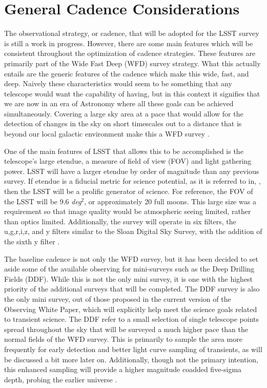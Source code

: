 \documentclass[12pt]{article}
\begin{document}
\section{General Cadence Considerations} %
The observational strategy, or cadence, that will be adopted for the LSST survey is still a work in progress. However, there are some main features which will be consistent throughout the optimization of cadence strategies. These features are primarily part of the Wide Fast Deep (WFD) survey strategy. What this actually entails are the generic features of the cadence which make this wide, fast, and deep. Naively these characteristics would seem to be something that any telescope would want the capability of having, but in this context it signifies that we are now in an era of Astronomy where all these goals can be achieved simultaneously. Covering a large sky area at a pace that would allow for the detection of changes in the sky on short timescales out to a distance that is beyond our local galactic environment make this a WFD survey \citep{LSSTScienceCollaboration2009}. \par
One of the main features of LSST that allows this to be accomplished is the telescope's large etendue, a measure of field of view (FOV) and light gathering power. LSST will have a larger etendue by order of magnitude than any previous survey. If etendue is a fiducial metric for science potential, as it is referred to in, \cite{LSSTScienceCollaboration2009}, then the LSST will be a prolific generator of science. For reference, the FOV of the LSST will be 9.6 \textit{deg}$^2$, or approximately 20 full moons. This large size was a requirement so that image quality would be atmospheric seeing limited, rather than optics limited. Additionally, the survey will operate in six filters, the u,g,r,i,z, and y filters similar to the Sloan Digital Sky Survey, with the addition of the sixth y filter \citep{LSSTScienceCollaboration2009}.   \par
The baseline cadence is not only the WFD survey, but it has been decided to set aside some of the available observing for mini-surveys such as the Deep Drilling Fields (DDF). While this is not the only mini survey, it is one with the highest priority of the additional surveys that will be completed. The DDF survey is also the only mini survey, out of those proposed in the current version of the Observing White Paper, which will explicitly help meet the science goals related to transient science. The DDF refer to a small selection of single telescope points spread throughout the sky that will be surveyed a much higher pace than the normal fields of the WFD survey. This is primarily to sample the area more frequently for early detection and better light curve sampling of transients, as will be discussed a bit more later on. Additionally, though not the primary intention, this enhanced sampling will provide a higher magnitude coadded five-sigma depth, probing the earlier universe \citep{LSSTScienceCollaboration2017}. \par
\end{document}
